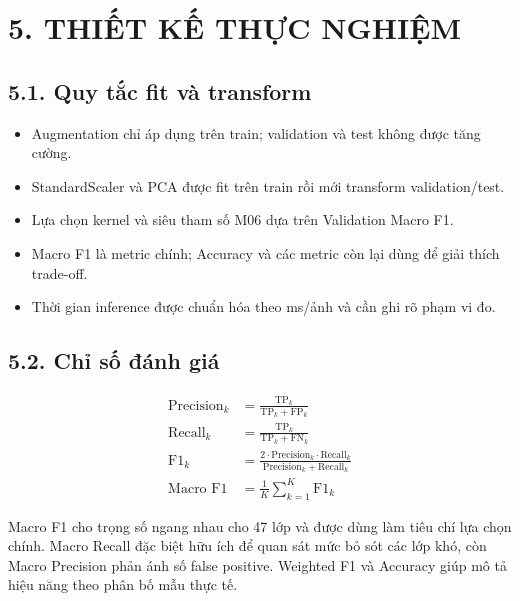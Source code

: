 \documentclass[12pt,a4paper]{article}
\begin{document}
\section{5. THIẾT KẾ THỰC
NGHIỆM}\label{thiux1ebft-kux1ebf-thux1ef1c-nghiux1ec7m}

\subsection{5.1. Quy tắc fit và
transform}\label{quy-tux1eafc-fit-vuxe0-transform}

\begin{itemize}
\item
  Augmentation chỉ áp dụng trên train; validation và test không được
  tăng cường.
\item
  StandardScaler và PCA được fit trên train rồi mới transform
  validation/test.
\item
  Lựa chọn kernel và siêu tham số M06 dựa trên Validation Macro F1.
\item
  Macro F1 là metric chính; Accuracy và các metric còn lại dùng để giải
  thích trade-off.
\item
  Thời gian inference được chuẩn hóa theo ms/ảnh và cần ghi rõ phạm vi
  đo.
\end{itemize}

\subsection{5.2. Chỉ số đánh
giá}\label{chux1ec9-sux1ed1-ux111uxe1nh-giuxe1}

\begin{align}                                            
\text{Precision}_k &= \frac{\text{TP}_k}{\text{TP}_k +
\text{FP}_k} \\[0.6em]                                     
\text{Recall}_k &= \frac{\text{TP}_k}{\text{TP}_k +  
\text{FN}_k} \\[0.6em]                                     
\text{F1}_k &= \frac{2 \cdot \text{Precision}_k \cdot
\text{Recall}_k}{\text{Precision}_k + \text{Recall}_k}     
\\[0.8em]                                                  
\text{Macro F1} &= \frac{1}{K} \sum_{k=1}^{K}        
\text{F1}_k                                                
\end{align}

Macro F1 cho trọng số ngang nhau cho 47 lớp và được dùng làm tiêu chí
lựa chọn chính. Macro Recall đặc biệt hữu ích để quan sát mức bỏ sót các
lớp khó, còn Macro Precision phản ánh số false positive. Weighted F1 và
Accuracy giúp mô tả hiệu năng theo phân bố mẫu thực tế.
\end{document}
